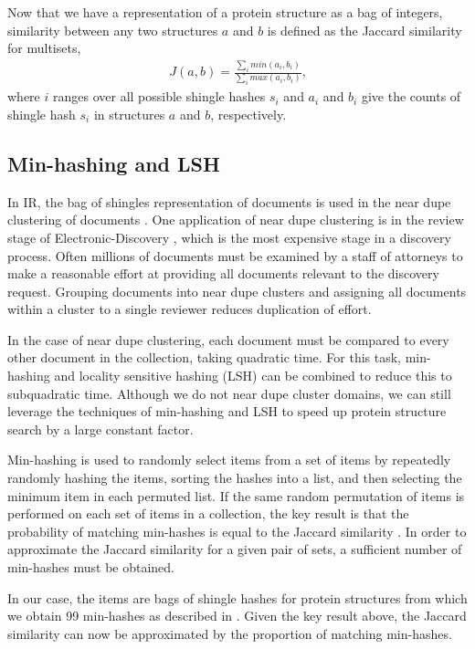 \documentclass[a4,center,fleqn]{NAR}
\begin{document}
Now that we have a representation of a protein structure as a bag of integers, similarity between any two structures $a$ and $b$ is defined as the Jaccard similarity \cite{Levan1971} for multisets,
\begin{align}
    J(a,b) = \frac{\sum_i min(a_i, b_i)}{\sum_i max(a_i,b_i)}\text{,}
\end{align}
where $i$ ranges over all possible shingle hashes $s_i$ and $a_i$ and $b_i$ give the counts of shingle hash $s_i$ in structures $a$ and $b$, respectively. 

\subsection{Min-hashing and LSH}

In IR, the bag of shingles representation of documents is used in the near dupe clustering of documents \cite{Broder1997b}.
One application of near dupe clustering is in the review stage of Electronic-Discovery \cite{Joshi2008}, which is the most expensive stage in a discovery process. 
Often millions of documents must be examined by a staff of attorneys to make a reasonable effort at providing all documents relevant to the discovery request. 
Grouping documents into near dupe clusters and assigning all documents within a cluster to a single reviewer reduces duplication of effort. 

In the case of near dupe clustering, each document must be compared to every other document in the collection, taking quadratic time.
For this task, min-hashing \cite{Broder1998} and locality sensitive hashing (LSH) \cite{Indyk1998} can be combined to reduce this to subquadratic time. 
Although we do not near dupe cluster domains, we can still leverage the techniques of min-hashing and LSH to speed up protein structure search by a large constant factor.

Min-hashing is used to randomly select items from a set of items by repeatedly randomly hashing the items, sorting the hashes into a list, and then selecting the minimum item in each permuted list.
If the same random permutation of items is performed on each set of items in a collection, the key result is that the probability of matching min-hashes is equal to the Jaccard similarity \cite{Broder1998}.
In order to approximate the Jaccard similarity for a given pair of sets, a sufficient number of min-hashes must be obtained. 

In our case, the items are bags of shingle hashes for protein structures from which we obtain 99 min-hashes as described in \cite{Rajaraman2012}. 
Given the key result above, the Jaccard similarity can now be approximated by the proportion of matching min-hashes. 
\end{document}
